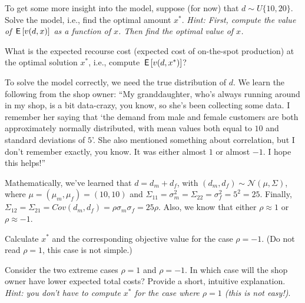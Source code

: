 \documentclass[assignments]{subfiles}
\begin{document}
\begin{exercise}
To get some more insight into the model, suppose (for now) that $d \sim U\{10, 20\}$.
    Solve the model, i.e., find the optimal amount $x^*$.
    \textit{Hint: First, compute the value of $\,\mathsf{E}\left[v(d,x)\right]$ as a function of $x$.
      Then find the optimal value of $x$.}
\end{exercise}

\begin{exercise}
 What is the expected recourse cost (expected cost of on-the-spot production) at the optimal solution $x^*$, i.e., compute $\,\mathsf{E}\left[v(d,x^*)\right]$?
\end{exercise}

To solve the model correctly, we need the true distribution of $d$. We learn the following from the shop owner: ``My granddaughter, who's always running around in my shop, is a bit data-crazy, you know, so she's been collecting some data. I remember her saying that `the demand from male and female customers are both approximately normally distributed, with mean values both equal to $10$ and standard deviations of $5$'. She also mentioned something about correlation, but I don't remember exactly, you know. It was either almost $1$ or almost $-1$. I hope this helps!''

Mathematically, we've learned that $d = d_m + d_f$, with $(d_m, d_f) \sim \mathcal{N}(\mu, \Sigma)$, where $\mu = (\mu_m, \mu_f) = (10,10)$ and $\Sigma_{11} = \sigma_m^2 = \Sigma_{22}  = \sigma_f^2 = 5^2 = 25$. Finally, $\Sigma_{12} = \Sigma_{21} = Cov(d_m, d_f) = \rho \sigma_m \sigma_f = 25 \rho$. Also, we know that either $\rho \approx 1$ or $\rho \approx -1$.

\begin{exercise}
 Calculate $x^*$ and the corresponding objective value for the case $\rho = -1$. (Do not read  $\rho=1$, this case is not simple.)
\end{exercise}

\begin{exercise}
Consider the two extreme cases $\rho = 1$ and $\rho = -1$.
In which case will the shop owner have lower expected total costs?
Provide a short, intuitive explanation.
\textit{Hint: you don't have to compute $x^*$ for the case where $\rho = 1$ (this is not easy!)}.
\end{exercise}
\end{document}

